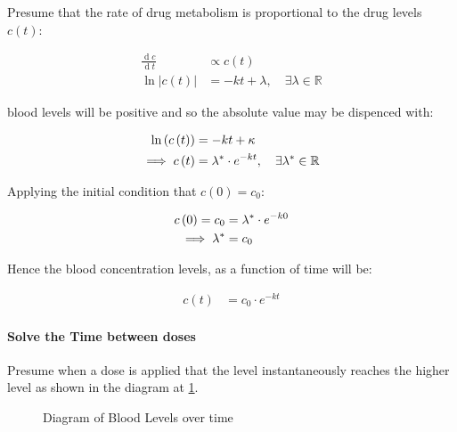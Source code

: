 Presume  that  the rate of  drug metabolism  is  proportional to the drug levels $c\left( t \right)$:


\begin{align*}
  \frac{\operatorname{d}c }{\operatorname{d} t} &\propto c\left( t \right) \\
  \ln{ \left| c\left( t \right) \right| } &= -kt+ \lambda, \quad \exists  \lambda \in \mathbb{R}
\end{align*}

blood levels will be positive and so the absolute value may be dispenced with:

\begin{align}
  \ln{ \left( c\left( t \right) \right) } &= -kt + \kappa \notag\\
  \implies  c\left( t \right) &= \lambda^*\cdot  e^{-kt}, \quad \exists \lambda^* \in \mathbb{R}
\end{align}

Applying the initial condition that $c\left( 0 \right)= c_0$:

\begin{align}
  c\left( 0 \right)= c_0 &= \lambda^*\cdot  e^{-k0} \notag \\
   \implies \lambda^* &= c_0 
\end{align}

Hence the blood concentration levels, as a function of time will be:

\begin{align}
  c\left( t \right)&= c_0\cdot  e^{-kt} 
\end{align}

\paragraph{Solve the Time between doses}

Presume when a dose is applied that the level instantaneously reaches the higher level as shown in the diagram at \ref{fig:Concentration Plot}.

\begin{figure}[h!]
  \caption{Diagram of Blood Levels over time}
  \label{fig:Concentration Plot}
\end{figure}

